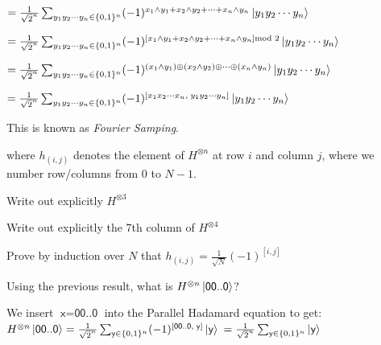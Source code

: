 $= 
\frac{1}{\sqrt{2}^n} \sum_{y_1 y_2 \dotsm y_n \in \{0,1\}^n}
(-1)^{x_1 \wedge y_1 + x_2 \wedge y_2 + \dotsm + x_n \wedge y_n} \left|y_1 y_2 \dotsm y_n\right\rangle
$

$= 
\frac{1}{\sqrt{2}^n} \sum_{y_1 y_2 \dotsm y_n \in \{0,1\}^n}
(-1)^{[x_1 \wedge y_1 + x_2 \wedge y_2 + \dotsm + x_n \wedge y_n] \text{mod } 2 } \left|y_1 y_2 \dotsm y_n\right\rangle
$

$= 
\frac{1}{\sqrt{2}^n} \sum_{y_1 y_2 \dotsm y_n \in \{0,1\}^n}
(-1)^{(x_1 \wedge y_1) \oplus (x_2 \wedge y_2) \oplus \dotsm \oplus (x_n \wedge y_n)} \left|y_1 y_2 \dotsm y_n\right\rangle
$

$= 
\frac{1}{\sqrt{2}^n} \sum_{y_1 y_2 \dotsm y_n \in \{0,1\}^n}
(-1)^{[x_1 x_2 \dotsm x_n, \; y_1 y_2 \dotsm y_n]} \left|y_1 y_2 \dotsm y_n\right\rangle
$




This is known as \textit{Fourier Samping}. 

\frmrule


where $h_{(i,j)}$ denotes the element of $H^{\otimes n}$ at row $i$ and column $j$, 
where we number row/columns from 0 to $N-1$. 


\frmrule

\begin{example}
Write out explicitly $H^{\otimes 3}$ 
\end{example}

\frmrule

\begin{example}
Write out explicitly the 7th column of $H^{\otimes 4}$ 
\end{example}

\frmrule

\begin{example}
Prove by induction over $N$ that $h_{(i,j)} = \frac{1}{\sqrt{N}}(-1)^{[i,j]}$
\end{example}

\frmrule

\begin{example}
Using the previous result, what is $H^{\otimes n}\left|\textsf{00..0}\right\rangle$?
\end{example}

We insert $\textsf{x} = \textsf{00..0}$ into the Parallel Hadamard equation to get:\\
$H^{\otimes n}\left|\textsf{00..0}\right\rangle = 
\frac{1}{\sqrt{2}^n} \sum_{\textsf{y} \in \{0,1\}^n}
(-1)^{[\textsf{00..0}, \; \textsf{y}]} \left|\textsf{y}\right\rangle$
$ = \frac{1}{\sqrt{2}^n} \sum_{\textsf{y} \in \{0,1\}^n} \left|\textsf{y}\right\rangle$


